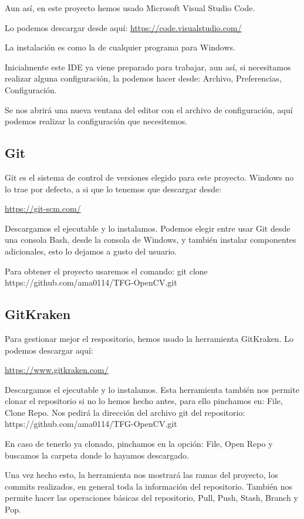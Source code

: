 Aun así, en este proyecto hemos usado Microsoft Visual Studio Code.

Lo podemos descargar desde aquí:
\url{https://code.visualstudio.com/}

La instalación es como la de cualquier programa para Windows.

Inicialmente este IDE ya viene preparado para trabajar, aun así, si necesitamos realizar alguna configuración, la podemos hacer desde: Archivo, Preferencias, Configuración.

Se nos abrirá una nueva ventana del editor con el archivo de configuración, aquí podemos realizar la configuración que necesitemos.


\subsection{Git}
Git es el sistema de control de versiones elegido para este proyecto. Windows no lo trae por defecto, a si que lo tenemos que descargar desde:

\url{https://git-scm.com/}

Descargamos el ejecutable y lo instalamos. Podemos elegir entre usar Git desde una consola Bash, desde la consola de Windows, y también instalar componentes adicionales, esto lo dejamos a gusto del usuario.

Para obtener el proyecto usaremos el comando: git clone https://github.com/ama0114/TFG-OpenCV.git

\subsection{GitKraken}
Para gestionar mejor el respositorio, hemos usado la herramienta GitKraken. Lo podemos descargar aquí:

\url{https://www.gitkraken.com/}

Descargamos el ejecutable y lo instalamos. Esta herramienta también nos permite clonar el repositorio si no lo hemos hecho antes, para ello pinchamos en: File, Clone Repo. Nos pedirá la dirección del archivo git del repositorio: https://github.com/ama0114/TFG-OpenCV.git

En caso de tenerlo ya clonado, pinchamos en la opción: File, Open Repo y buscamos la carpeta donde lo hayamos descargado.

Una vez hecho esto, la herramienta nos mostrará las ramas del proyecto, los commits realizados, en general toda la información del repositorio. También nos permite hacer las operaciones básicas del repositorio, Pull, Push, Stash, Branch y Pop.

